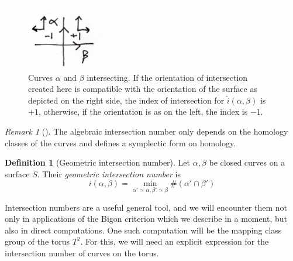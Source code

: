 \documentclass[reqno]{amsart}
\theoremstyle{definition}
\newtheorem{definition}[theorem]{Definition}
\theoremstyle{remark}
\newtheorem*{remark}{Remark}
\begin{document}
\begin{figure}[H]
    \centering
    \includegraphics[width=0.3\textwidth]{algebraic-intersection-number.jpg}
    \caption{Curves $\alpha$ and $\beta$ intersecting. 
    If the orientation of intersection created here is
compatible with the orientation of the surface as
depicted on the right side, the index
of intersection for
$\hat{i} \left( \alpha,\beta \right) $ is $+1$, otherwise, if the
orientation is as on the left, the index is $-1$.}
    \label{fig:algebraic-intersection-number-jpg}
\end{figure}

\begin{remark}[]
    The algebraic intersection number only depends on the
    homology classes of the curves and defines
    a symplectic form on homology.
\end{remark}

\begin{definition}[Geometric intersection number]
    Let $\alpha, \beta$ be closed curves on a surface $S$.
    Their \textit{geometric intersection number} is
    \[
    i \left( \alpha, \beta \right) =
    \min_{\alpha' \simeq \alpha, \beta' \simeq \beta}
    \# \left( \alpha' \cap \beta' \right) 
    \] 
\end{definition}

Intersection numbers are a useful general tool, and we will
encounter them not only in applications of the Bigon criterion
which we describe in a moment, but also in direct computations.
One such computation will be the mapping class group of the
torus $T^2$. For this, we will need an explicit expression
for the intersection number of curves on the torus.
\end{document}
